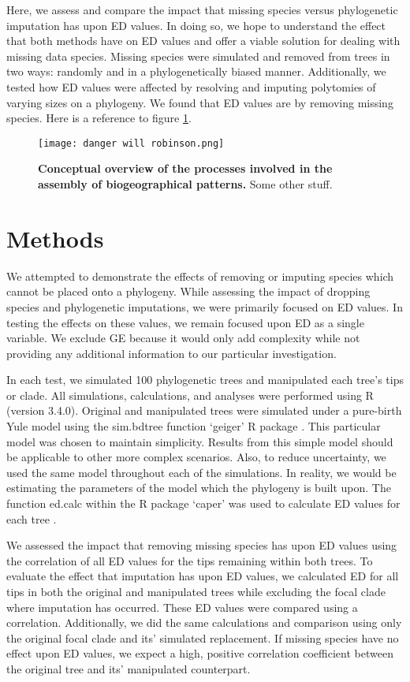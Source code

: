 \documentclass[12pt,english]{article}
\begin{document}
Here, we assess and compare the impact that missing species versus
phylogenetic imputation has upon ED values. In doing so, we hope to
understand the effect that both methods have on ED values and offer a
viable solution for dealing with missing data species. Missing species
were simulated and removed from trees in two ways: randomly and in a
phylogenetically biased manner. Additionally, we tested how ED values
were affected by resolving and imputing polytomies of varying sizes on
a phylogeny. We found that ED values are by removing missing
species. Here is a reference to figure \ref{conceptual}.

\begin{figure}
  \center
  \texttt{[image: danger will robinson.png]}
  \caption{\textbf{Conceptual overview of the processes involved in
      the assembly of biogeographical patterns.} Some other stuff.}
  \label{conceptual}
\end{figure}

\section*{Methods}
We attempted to demonstrate the effects of removing or imputing
species which cannot be placed onto a phylogeny. While assessing the
impact of dropping species and phylogenetic imputations, we were
primarily focused on ED values. In testing the effects on these
values, we remain focused upon ED as a single variable. We exclude GE
because it would only add complexity while not providing any
additional information to our particular investigation.

In each test, we simulated 100 phylogenetic trees and manipulated each
tree’s tips or clade. All simulations, calculations, and analyses were
performed using R (version 3.4.0). Original and manipulated trees were
simulated under a pure-birth Yule model using the sim.bdtree function
‘geiger’ R package \autocite{harmon2007geiger}. This particular model was
chosen to maintain simplicity. Results from this simple model should
be applicable to other more complex scenarios. Also, to reduce
uncertainty, we used the same model throughout each of the
simulations. In reality, we would be estimating the parameters of the
model which the phylogeny is built upon. The function ed.calc within
the R package ‘caper’ was used to calculate ED values for each tree
\autocite{orme2013caper}.

We assessed the impact that removing missing species has upon ED
values using the correlation of all ED values for the tips remaining
within both trees. To evaluate the effect that imputation has upon ED
values, we calculated ED for all tips in both the original and
manipulated trees while excluding the focal clade where imputation has
occurred. These ED values were compared using a
correlation. Additionally, we did the same calculations and comparison
using only the original focal clade and its’ simulated replacement. If
missing species have no effect upon ED values, we expect a high,
positive correlation coefficient between the original tree and its’
manipulated counterpart.
\end{document}
